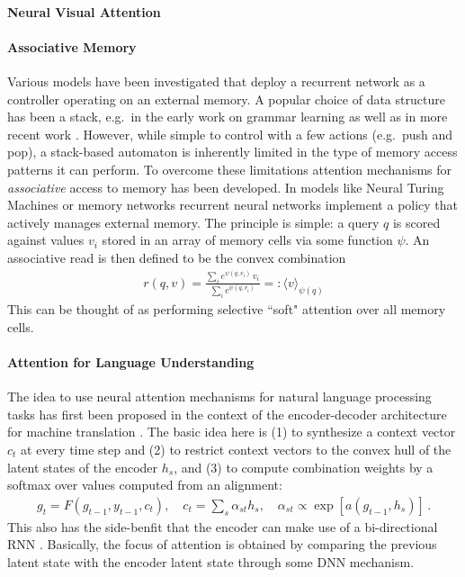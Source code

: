\documentclass{article}
\begin{document}
\paragraph{Neural Visual Attention} 




\newpage

\paragraph{Associative Memory} Various models have been investigated that deploy a recurrent network as a controller operating on an external memory. A popular choice of data structure has been a stack, e.g.~in the early work on grammar learning \cite{das1992learning, mozer1993connectionist, zeng1994discrete} as well as in more recent work \cite{joulin2015inferring}. However, while simple to control with a few actions (e.g.~push and pop), a stack-based automaton is inherently limited in the type of memory access patterns it can perform. To overcome these limitations attention mechanisms for \textit{associative} access to memory has been developed. In models like Neural Turing Machines \cite{graves2014neural} or memory networks \cite{sukhbaatar2015end} recurrent neural networks implement a policy that actively manages external memory. The principle is simple: a query $q$ is scored against  values $v_i$ stored in an array of memory cells via some function $\psi$. An associative read is then defined to be the convex combination
\begin{align}
r(q,v) =   \frac{
	\sum_i e^{\psi(q,v_i)} \, v_i
}{
	\sum_i e^{\psi(q,v_i)}
} =: \langle v \rangle_{\psi(q)}
\end{align}
This can be thought of as performing selective ``soft" attention over all memory cells. 


\paragraph{Attention for Language Understanding} The idea to use neural attention mechanisms for natural language processing tasks has first been proposed in the context of the encoder-decoder architecture \cite{sutskever2014sequence,cho2014learning} for machine translation \cite{bahdanau2014neural}. The basic idea here is (1) to synthesize a context vector $c_t$ at every time step and (2)  to restrict context vectors to the convex hull of the latent states of the encoder $h_s$, and (3) to compute combination weights by a softmax over values computed from an alignment:
\begin{align}
g_t = F(g_{t-1}, y_{t-1},  c_{t}), \quad c_t = \sum_{s} \alpha_{st} h_s, \quad \alpha_{st} \propto \exp[a(g_{t-1},h_s)] \,.
\end{align}
This also has the side-benfit that the encoder can make use of a bi-directional RNN \cite{schuster1997bidirectional}. Basically, the focus of attention is obtained by comparing the previous latent state with the encoder latent state through some DNN mechanism. 


\newpage


\cite{denil2012learning}





\end{document}
